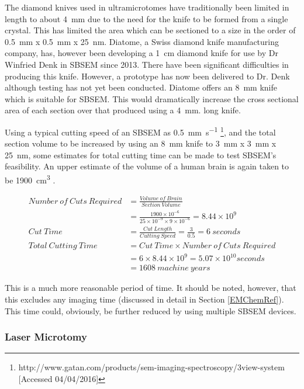 \documentclass[a4paper, 11pt]{article}
\numberwithin{equation}{section}
\begin{document}
	The diamond knives used in ultramicrotomes have traditionally been limited in length to about \SI{4}{\milli\meter} due to the need for the knife to be formed from a single crystal. This has limited the area which can be sectioned to a size in the order of \SI{0.5}{\milli\metre} x \SI{0.5}{\milli\metre} x \SI{25}{\nano\metre}\cite{briggman2011wiring}. Diatome, a Swiss diamond knife manufacturing company, has, however been developing a \SI{1}{\centi\metre} diamond knife for use by Dr Winfried Denk in SBSEM since 2013. There have been significant difficulties in producing this knife. However, a prototype has now been delivered to Dr. Denk although testing has not yet been conducted. Diatome offers an \SI{8}{\milli\meter} knife which is suitable for SBSEM\cite{diatome_gnaegi}. This would dramatically increase the cross sectional area of each section over that produced using a \SI{4}{\milli\meter}. long knife.
	
	Using a typical cutting speed of an SBSEM as \SI{0.5}{\milli\meter\per\second} \footnote{http://www.gatan.com/products/sem-imaging-spectroscopy/3view-system [Accessed 04/04/2016]}, and the total section volume to be increased by using an \SI{8}{\milli\metre} knife to \SI{3}{\milli\metre} x \SI{3}{\milli\metre} x \SI{25}{\nano\metre}, some estimates for total cutting time can be made to test SBSEM's feasibility. An upper estimate of the volume of a human brain is again taken to be \SI{1900}{\centi\metre\cubed}\cite{cosgrove2007evolving} .
	
	\begin{align}
	Number\ of\ Cuts\ Required &= \frac{Volume\ of\ Brain}{Section\ Volume} \nonumber \\
	&= \frac{1900\times10^{-6}}{25\times10^{-9} \times 9\times10^{-6}} = 8.44\times10^{9} \nonumber \\
	Cut\ Time &= \frac{Cut\ Length}{Cutting\ Speed} = \frac{3}{0.5} = 6\ seconds \nonumber \\
	Total\ Cutting\ Time &= Cut\ Time \times Number\ of\ Cuts\ Required \nonumber \\
	&= 6 \times 8.44\times10^{9} = 5.07\times10^{10} seconds \nonumber \\
	&= 1608\ machine\ years
	\end{align}
	
	This is a much more reasonable period of time. It should be noted, however, that this excludes any imaging time (discussed in detail in Section \ref{EMChemRef}). This time could, obviously, be further reduced by using multiple SBSEM devices.
	\subsubsection{Laser Microtomy}
	\label{sectioning_smaller_laser}
	
\end{document}
